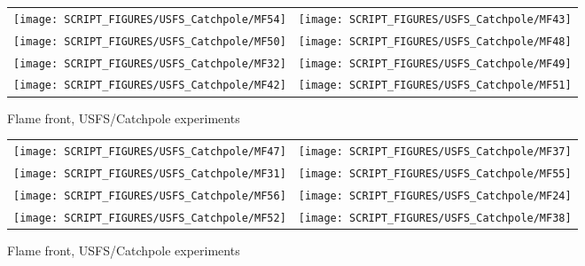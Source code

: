 \newpage

\begin{figure}[p]
\begin{tabular*}{\textwidth}{l@{\extracolsep{\fill}}r}
\texttt{[image: SCRIPT\_FIGURES/USFS\_Catchpole/MF54]} &
\texttt{[image: SCRIPT\_FIGURES/USFS\_Catchpole/MF43]} \\
\texttt{[image: SCRIPT\_FIGURES/USFS\_Catchpole/MF50]} &
\texttt{[image: SCRIPT\_FIGURES/USFS\_Catchpole/MF48]} \\
\texttt{[image: SCRIPT\_FIGURES/USFS\_Catchpole/MF32]} &
\texttt{[image: SCRIPT\_FIGURES/USFS\_Catchpole/MF49]} \\
\texttt{[image: SCRIPT\_FIGURES/USFS\_Catchpole/MF42]} &
\texttt{[image: SCRIPT\_FIGURES/USFS\_Catchpole/MF51]} \\
\end{tabular*}
\caption[Flame front, USFS/Catchpole experiments]{Flame front, USFS/Catchpole experiments}
\label{USFS_Catchpole_008}
\end{figure}

\begin{figure}[p]
\begin{tabular*}{\textwidth}{l@{\extracolsep{\fill}}r}
\texttt{[image: SCRIPT\_FIGURES/USFS\_Catchpole/MF47]} &
\texttt{[image: SCRIPT\_FIGURES/USFS\_Catchpole/MF37]} \\
\texttt{[image: SCRIPT\_FIGURES/USFS\_Catchpole/MF31]} &
\texttt{[image: SCRIPT\_FIGURES/USFS\_Catchpole/MF55]} \\
\texttt{[image: SCRIPT\_FIGURES/USFS\_Catchpole/MF56]} &
\texttt{[image: SCRIPT\_FIGURES/USFS\_Catchpole/MF24]} \\
\texttt{[image: SCRIPT\_FIGURES/USFS\_Catchpole/MF52]} &
\texttt{[image: SCRIPT\_FIGURES/USFS\_Catchpole/MF38]} \\
\end{tabular*}
\caption[Flame front, USFS/Catchpole experiments]{Flame front, USFS/Catchpole experiments}
\label{USFS_Catchpole_016}
\end{figure}

